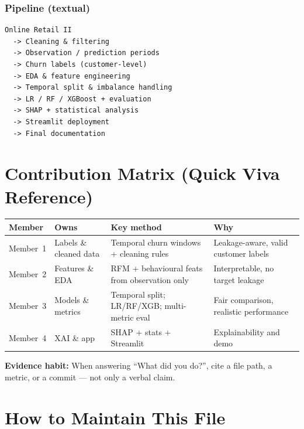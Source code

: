 \documentclass[11pt,a4paper]{article}
\begin{document}
\subsubsection*{Pipeline (textual)}
\begin{verbatim}
Online Retail II
  -> Cleaning & filtering
  -> Observation / prediction periods
  -> Churn labels (customer-level)
  -> EDA & feature engineering
  -> Temporal split & imbalance handling
  -> LR / RF / XGBoost + evaluation
  -> SHAP + statistical analysis
  -> Streamlit deployment
  -> Final documentation
\end{verbatim}

\newpage
\section{Contribution Matrix (Quick Viva Reference)}

\begin{tabular}{|p{}|p{}|p{}|p{}|}
\hline
\textbf{Member} & \textbf{Owns} & \textbf{Key method} & \textbf{Why} \\
\hline
Member~1 & Labels \& cleaned data & Temporal churn windows + cleaning rules & Leakage-aware, valid customer labels \\
\hline
Member~2 & Features \& EDA & RFM + behavioural feats from observation only & Interpretable, no target leakage \\
\hline
Member~3 & Models \& metrics & Temporal split; LR/RF/XGB; multi-metric eval & Fair comparison, realistic performance \\
\hline
Member~4 & XAI \& app & SHAP + stats + Streamlit & Explainability and demo \\
\hline
\end{tabular}

\vspace{1em}
\noindent\textbf{Evidence habit:} When answering ``What did you do?'', cite a
file path, a metric, or a commit --- not only a verbal claim.

\newpage
\section{How to Maintain This File}
\end{document}

